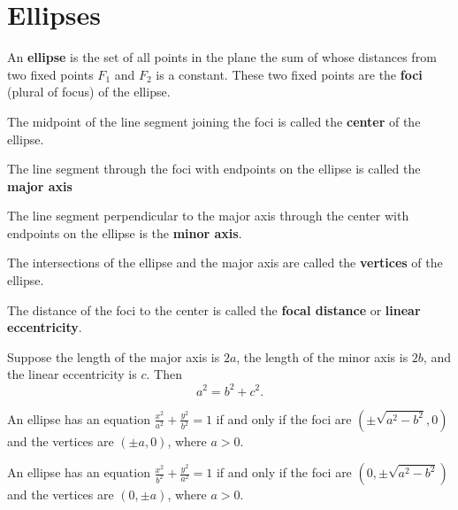 \section{Ellipses}

\begin{definition}
An \textbf{ellipse} is the set of all points in the plane the sum of whose distances from two fixed points $F_1$ and $F_2$ is a constant. These two fixed points are the \textbf{foci} (plural of focus) of the ellipse.

The midpoint of the line segment joining the foci is called the \textbf{center} of the ellipse.

The line segment through the foci with endpoints on the ellipse is called the \textbf{major axis}

The line segment perpendicular to the major axis through the center with endpoints on the ellipse is the \textbf{minor axis}.

The intersections of the ellipse and the major axis are called the \textbf{vertices} of the ellipse.

The distance of the foci to the center is called the \textbf{focal distance} or \textbf{linear eccentricity}. 

\end{definition}

\begin{proposition}
    Suppose the length of the major axis is $2a$, the length of the minor axis is $2b$, and the linear eccentricity is $c$. Then
    \[a^2=b^2+c^2.\]
\end{proposition}

\begin{theorem}
An ellipse has an equation $\frac{x^2}{a^2}+\frac{y^2}{b^2}=1$ if and only if the foci are $(\pm \sqrt{a^2-b^2}, 0)$ and the vertices are $(\pm a, 0)$, where $a>0$.
\end{theorem}

\begin{theorem}
An ellipse has an equation $\frac{x^2}{b^2}+\frac{y^2}{a^2}=1$ if and only if the foci are $(0, \pm \sqrt{a^2-b^2})$ and the vertices are $(0, \pm a)$, where $a>0$.
\end{theorem}


